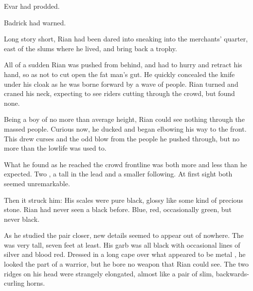 \begin{garbage}
 Evar had prodded. 

 Badrick had warned. 

Long story short, Rian had been dared into sneaking into the merchants' quarter, east of the slums where he lived, and bring back a trophy. 


All of a sudden Rian was pushed from behind, and had to hurry and retract his hand, so as not to cut open the fat man's gut. He quickly concealed the knife under his cloak as he was borne forward by a wave of people. Rian turned and craned his neck, expecting to see riders cutting through the crowd, but found none. 


Being a boy of no more than average height, Rian 
could see nothing through the massed people. Curious now, he ducked and began elbowing his way to the front. This drew curses and the odd blow from the people he pushed through, but no more than the lowlife was used to. 

What he found as he reached the crowd frontline was both more and less than he expected. Two \scathae, a tall \dax{} in the lead and a smaller \sphyle{} following. %
At first sight both seemed unremarkable. 


Then it struck him: 
 His scales were pure black, glossy like some kind of precious stone. Rian had never seen a black \scatha{} before. Blue, red, occasionally green, but never black. 

As he studied the pair closer, new details seemed to appear out of nowhere. The \dax{} was very tall, seven feet at least. His garb was all black with occasional lines of silver and blood red. Dressed in a long cape over what appeared to be metal \armour, he looked the part of a warrior, but he bore no weapon that Rian could see. 
The two ridges on his head were strangely elongated, almost like a pair of slim, backwards-curling horns. 


\end{garbage}
